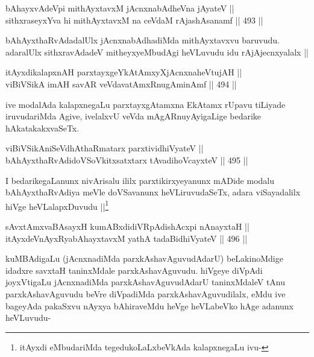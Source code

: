 \begin{shl}
bAhayxvAdeV\s pi mithAyxtavxM jAcnxnabAdheVna jAyateV || \\
sithxraseyxYva hi mithAyxtavxM na ceVdaM rAjashAsanamf ||  493 ||  
\end{shl}

\begin{artha}
bAhAyxthaRvAdadalUlx jAcnxnabAdhadiMda mithAyxtavxvu baruvudu. adaralUlx sithxravAdadeV mitheyxyeMbudAgi heVLuvudu idu rAjAjecnxyalalx ||
\end{artha}


\begin{shl}
itAyxdikalapxnAH parxtayxgeYkAtAmxyXjAcnxnaheVtujAH || \\
viBiVSikA imAH savAR veVdavatAmxRnugAminAmf ||  494 ||  
\end{shl}

\begin{artha}
ive modalAda kalapxnegaLu parxtayxgAtamxna EkAtamx rUpavu tiLiyade iruvudariMda Agive, ivelalxvU veVda mAgARnuyAyigaLige bedarike hAkatakakxvaSeTx.
\end{artha}

\begin{shl}
viBiVSikAniSeVdhAthaRmatarx parxtividhiVyateV || \\
bAhAyxthaRvAdidoVSoVkitxsatxtarx tAvadihoVcayxteV ||  495 ||  
\end{shl}

\begin{artha}
I bedarikegaLanunx nivArisalu ililx parxtikirxyeyanunx mADide modalu bAhAyxthaRvAdiya meVle doVSavanunx heVLiruvudaSeTx, adara viSayadalilx hiVge heVLalapxDuvudu ||\footnote{itAyxdi eMbudariMda tegedukoLaLxbeVkAda kalapxnegaLu ivu-}
\end{artha}

\begin{shl}
sAvxtAmxvaBAsayxH kumABxdidiVRpAdishAcxpi nAnayxtaH || \\
itAyxdeVnAyxRyabAhayxtavxM yathA tadaBidhiVyateV ||  496 ||  
\end{shl}

\begin{artha}
kuMBAdigaLu (jAcnxnadiMda parxkAshavAguvudAdarU) beLakinoMdige idadxre savxtaH taninxMdale parxkAshavAguvudu. hiVgeye diVpAdi joyxVtigaLu jAcnxnadiMda parxkAshavAguvudAdarU taninxMdaleV tAnu parxkAshavAguvudu beVre diVpadiMda parxkAshavAguvudilalx, eMdu ive bageyAda pakaSxvu nAyxya bAhiraveMdu heVge heVLabeVko hAge adanunx heVLuvudu-
\end{artha}

